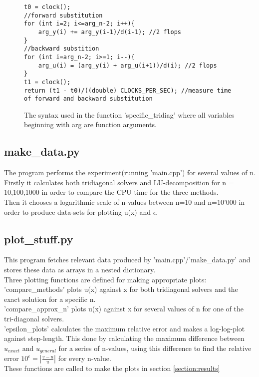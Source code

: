 \documentclass[11pt,a4paper,notitlepage]{article}
\begin{document}
\begin{figure}
\label{code:specific_syntax}
\lstset{style=c++style}
\begin{lstlisting}[frame=single]
t0 = clock();
//forward substitution
for (int i=2; i<=arg_n-2; i++){
	arg_y(i) += arg_y(i-1)/d(i-1); //2 flops
}
//backward substition
for (int i=arg_n-2; i>=1; i--){
    arg_u(i) = (arg_y(i) + arg_u(i+1))/d(i); //2 flops
}
t1 = clock();
return (t1 - t0)/((double) CLOCKS_PER_SEC); //measure time of forward and backward substitution
\end{lstlisting}
\caption{The syntax used in the function 'specific\_tridiag' where all variables beginning with arg are function arguments.}
\end{figure}

\subsection{make\_data.py}
	The program performs the experiment(running 'main.cpp') for several values of n. \\
	Firstly it calculates both tridiagonal solvers and LU-decomposition for n = 10,100,1000 in order to compare the CPU-time for the three methods. \\
	Then it chooses a logarithmic scale of n-values between n=10 and n=10'000 in order to produce data-sets for plotting u(x) and $\epsilon$.

\subsection{plot\_stuff.py}
	This program fetches relevant data produced by 'main.cpp'/'make\_data.py' and stores these data as arrays in a nested dictionary. \\
	Three plotting functions are defined for making appropriate plots: \\
	'compare\_methods' plots u(x) against x for both tridiagonal solvers and the exact solution for a specific n. \\
	'compare\_approx\_n' plots u(x) against x for several values of n for one of the tri-diagonal solvers. \\
	'epsilon\_plots' calculates the maximum relative error and makes a log-log-plot against step-length. This done by calculating the maximum difference between $u_{exact}$ and $u_{general}$ for a series of n-values, using this difference to find the relative error $10^\epsilon = \left|\frac{v-u}{u}\right|$ for every n-value. \\
	These functions are called to make the plots in section \ref{section:results}
	
\end{document}
